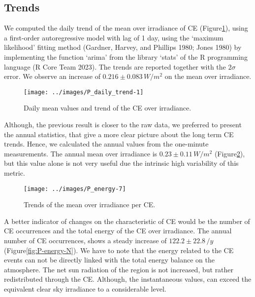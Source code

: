 \documentclass[
]{article}
\begin{document}
\hypertarget{trends}{%
\subsection{Trends}\label{trends}}

We computed the daily trend of the mean over irradiance of CE
(Figure\nobreakspace{}\ref{fig:CEmeanDaily}), using a first-order autoregressive
model with lag of 1 day, using the `maximum likelihood' fitting method (Gardner, Harvey, and Phillips 1980; Jones 1980) by implementing the function `arima' from the library `stats' of the R
programming language (R Core Team 2023). The trends are reported together with the \(2\sigma\)
error. We observe an increase of
\(0.216\pm 0.083\,W/m^2\)
on the mean over irradiance.

\begin{figure}[h!]

{\centering \texttt{[image: ../images/P\_daily\_trend-1]} 

}

\caption{Daily mean values and trend of the CE over irradiance.}\label{fig:CEmeanDaily}
\end{figure}

Although, the previous result is closer to the raw data, we preferred to present the
annual statistics, that give a more clear picture about the long term CE trends.
Hence, we calculated the annual values from the one-minute measurements. The annual
mean over irradiance is
\(0.23\pm 0.11\,W/m^2\)
(Figure\nobreakspace{}\ref{fig:P-energy-mean}),
but this value alone is not very useful due the intrinsic high variability of this
metric.

\begin{figure}[h!]

{\centering \texttt{[image: ../images/P\_energy-7]} 

}

\caption{Trends of the mean over irradiance per CE.}\label{fig:P-energy-mean}
\end{figure}

A better indicator of changes on the characteristic of CE would be the number of CE
occurrences and the total energy of the CE over irradiance. The annual number of CE
occurrences, shows a steady increase of
\(122.2\pm 22.8\,/y\)
(Figure\nobreakspace{}\ref{fig:P-energy-N}).
We have to note that the energy related to the CE events can not be directly linked
with the total energy balance on the atmosphere. The net sun radiation of the region
is not increased, but rather redistributed through the CE. Although, the
instantaneous values, can exceed the equivalent clear sky irradiance to a
considerable level.
\end{document}
